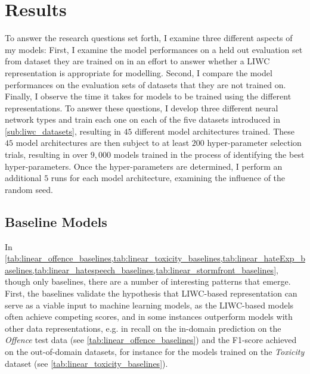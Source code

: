 \section{Results}

To answer the research questions set forth, I examine three different aspects of my models: First, I examine the model performances on a held out evaluation set from dataset they are trained on in an effort to answer whether a LIWC representation is appropriate for modelling.
Second, I compare the model performances on the evaluation sets of datasets that they are not trained on. Finally, I observe the time it takes for models to be trained using the different representations.
To answer these questions, I develop three different neural network types and train each one on each of the five datasets introduced in \cref{sub:liwc_datasets}, resulting in $45$ different model architectures trained. These $45$ model architectures are then subject to at least $200$ hyper-parameter selection trials, resulting in over $9,000$ models trained in the process of identifying the best hyper-parameters. Once the hyper-parameters are determined, I perform an additional $5$ runs for each model architecture, examining the influence of the random seed.

\subsection{Baseline Models}
In \cref{tab:linear_offence_baselines,tab:linear_toxicity_baselines,tab:linear_hateExp_baselines,tab:linear_hatespeech_baselines,tab:linear_stormfront_baselines}, though only baselines, there are a number of interesting patterns that emerge.
First, the baselines validate the hypothesis that LIWC-based representation can serve as a viable input to machine learning models, as the LIWC-based models often achieve competing scores, and in some instances outperform models with other data representations, e.g. in recall on the in-domain prediction on the \textit{Offence} test data (see \cref{tab:linear_offence_baselines}) and the F1-score achieved on the out-of-domain datasets, for instance for the models trained on the \textit{Toxicity} dataset (see \cref{tab:linear_toxicity_baselines}).


